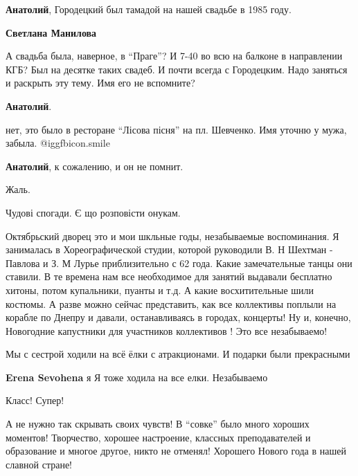 \begin{itemize}
\begin{itemize}
\begin{itemize}
\textbf{Анатолий}, Городецкий был тамадой на нашей свадьбе в 1985 году.

\textbf{Светлана Манилова} 

А свадьба была, наверное, в \enquote{Праге}? И 7-40 во всю на балконе в направлении
КГБ? Был на десятке таких свадеб. И почти всегда с Городецким. Надо заняться и
раскрыть эту тему. Имя его не вспомните?

\textbf{Анатолий}. 

нет, это было в ресторане \enquote{Лісова пісня} на пл. Шевченко. Имя уточню у
мужа, забыла. @igg{fbicon.smile} 

\textbf{Анатолий}, к сожалению, и он не помнит.

\end{itemize} %

Жаль.

\end{itemize} %

Чудові спогади. Є що розповісти онукам.


Октябрьский дворец это и мои шкльные годы, незабываемые воспоминания. Я
занималась в Хореографической студии, которой руководили В. Н Шехтман - Павлова и
З. М Лурье приблизительно с 62 года. Какие замечательные танцы они ставили. В те
времена нам все необходимое для занятий выдавали бесплатно хитоны, потом
купальники, пуанты и т.д. А какие восхитительные шили костюмы. А разве можно
сейчас представить, как все коллективы поплыли на корабле по Днепру и давали,
останавливаясь в городах, концерты! Ну и, конечно, Новогодние капустники для
участников коллективов ! Это все незабываемо!


Мы с сестрой ходили на всё ёлки с атракционами. И подарки были прекрасными

\textbf{Erena Sevohena} я Я тоже ходила на все елки. Незабываемо

Класс! Супер!


А не нужно так скрывать своих чувств! В \enquote{совке} было много хороших моментов!
Творчество, хорошее настроение, классных преподавателей и образование и многое
другое, никто не отменял! Хорошего Нового года в нашей славной стране!



\end{itemize}

